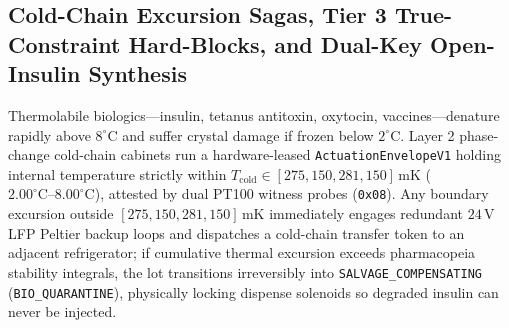\subsection{Cold-Chain Excursion Sagas, Tier 3 True-Constraint Hard-Blocks, and Dual-Key Open-Insulin Synthesis}

Thermolabile biologics---insulin, tetanus antitoxin, oxytocin, vaccines---denature rapidly above $8^\circ\mathrm{C}$ and suffer crystal damage if frozen
below $2^\circ\mathrm{C}$. Layer 2 phase-change cold-chain cabinets run a hardware-leased \texttt{ActuationEnvelopeV1} holding internal temperature
strictly within $T_{\mathrm{cold}} \in [275{,}150, 281{,}150]\,\mathrm{mK}$ ($2.00^\circ\mathrm{C}\text{--}8.00^\circ\mathrm{C}$), attested by dual PT100
witness probes (\texttt{0x08}). Any boundary excursion outside $[275{,}150, 281{,}150]\,\mathrm{mK}$ immediately engages redundant $24\,\mathrm{V}$ LFP
Peltier backup loops and dispatches a cold-chain transfer token to an adjacent refrigerator; if cumulative thermal excursion exceeds pharmacopeia
stability integrals, the lot transitions irreversibly into \texttt{SALVAGE\_COMPENSATING} (\texttt{BIO\_QUARANTINE}), physically locking dispense
solenoids so degraded insulin can never be injected.

